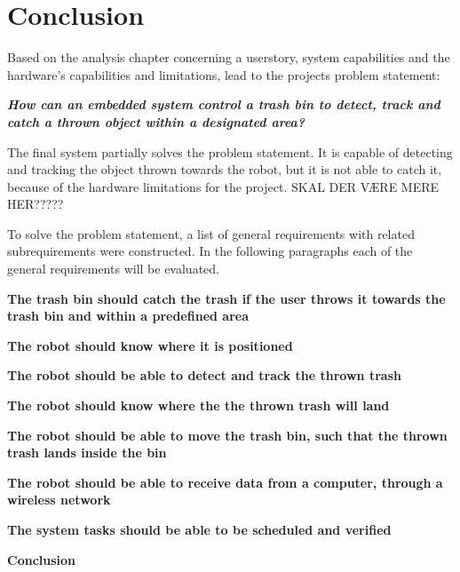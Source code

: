 \chapter{Conclusion}
\label{chap:Conclusion}
Based on the analysis chapter concerning a userstory, system capabilities and the hardware's capabilities and limitations, lead to the projects problem statement: 

\textbf{\textit{How can an embedded system control a trash bin to detect, track and catch a thrown object within a designated area?}}


The final system partially solves the problem statement. It is capable of detecting and tracking the object thrown towards the robot, but it is not able to catch it, because of the hardware limitations for the project. SKAL DER VÆRE MERE HER?????

To solve the problem statement, a list of general requirements with related subrequirements were constructed. In the following paragraphs each of the general requirements will be evaluated. 

\textbf{The trash bin should catch the trash if the user throws it towards the trash bin and within a predefined area}\newline


\textbf{The robot should know where it is positioned}\newline


\textbf{The robot should be able to detect and track the thrown trash}\newline


\textbf{The robot should know where the the thrown trash will land}\newline


\textbf{The robot should be able to move the trash bin, such that the thrown trash lands inside the bin}\newline


\textbf{The robot should be able to receive data from a computer, through a wireless network}\newline


\textbf{The system tasks should be able to be scheduled and verified}\newline


\textbf{Conclusion}\newline


